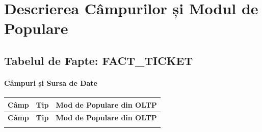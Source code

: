 \chapter{Descrierea Câmpurilor și Modul de Populare}
\label{sec:campuri_populare}

\section{Tabelul de Fapte: FACT\_TICKET}

\subsubsection{Câmpuri și Sursa de Date}

\begin{longtable}{|>{\raggedright\arraybackslash}p{3.5cm}|>{\raggedright\arraybackslash}p{2.8cm}|>{\raggedright\arraybackslash}p{8.7cm}|}
\hline
\textbf{Câmp} & \textbf{Tip} & \textbf{Mod de Populare din OLTP} \\
\hline
\endfirsthead
\hline
\textbf{Câmp} & \textbf{Tip} & \textbf{Mod de Populare din OLTP} \\
\hline
\endhead
\hline
\endfoot
\hline
\endlastfoot


\end{longtable}
